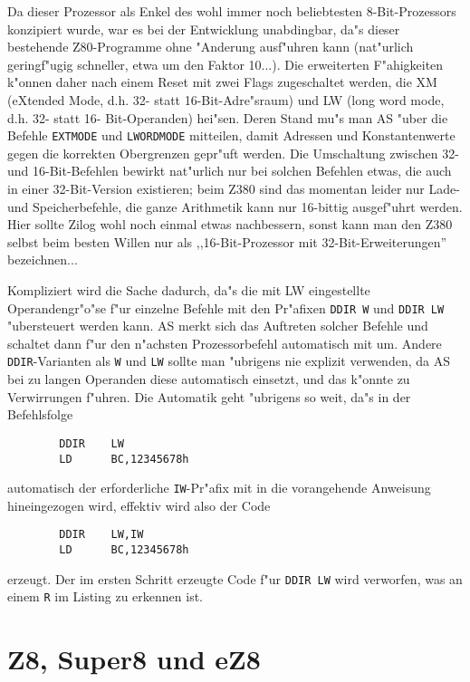 \documentclass[12pt,a4paper,twoside]{report}
\newcommand{\tty}[1]{{\tt #1}}
\begin{document}
Da dieser Prozessor als Enkel des wohl immer noch beliebtesten
8-Bit-Prozessors konzipiert wurde, war es bei der Entwicklung
unabdingbar, da"s dieser bestehende Z80-Programme ohne "Anderung
ausf"uhren kann (nat"urlich geringf"ugig schneller, etwa um den
Faktor 10...).  Die erweiterten F"ahigkeiten k"onnen daher nach
einem Reset mit zwei Flags zugeschaltet werden, die XM (eXtended
Mode, d.h. 32- statt 16-Bit-Adre"sraum) und LW (long word mode,
d.h. 32- statt 16- Bit-Operanden) hei"sen.  Deren Stand mu"s man
AS "uber die Befehle \tty{EXTMODE} und \tty{LWORDMODE} mitteilen, damit
Adressen und Konstantenwerte gegen die korrekten Obergrenzen
gepr"uft werden.  Die Umschaltung zwischen 32- und 16-Bit-Befehlen
bewirkt nat"urlich nur bei solchen Befehlen etwas, die auch in
einer 32-Bit-Version existieren; beim Z380 sind das momentan
leider nur Lade- und Speicherbefehle, die ganze Arithmetik kann
nur 16-bittig ausgef"uhrt werden.  Hier sollte Zilog wohl noch
einmal etwas nachbessern, sonst kann man den Z380 selbst beim
besten Willen nur als ,,16-Bit-Prozessor mit 32-Bit-Erweiterungen''
bezeichnen...

Kompliziert wird die Sache dadurch, da"s die mit LW eingestellte
Operandengr"o"se f"ur einzelne Befehle mit den Pr"afixen \tty{DDIR W}
und \tty{DDIR LW} "ubersteuert werden kann.  AS merkt sich das
Auftreten solcher Befehle und schaltet dann f"ur den n"achsten
Prozessorbefehl automatisch mit um.  Andere \tty{DDIR}-Varianten
als \tty{W} und \tty{LW} sollte man "ubrigens nie explizit
verwenden, da AS bei zu langen Operanden diese automatisch
einsetzt, und das k"onnte zu Verwirrungen f"uhren.  Die Automatik
geht "ubrigens so weit, da"s in der Befehlsfolge
\begin{verbatim}
        DDIR    LW
        LD      BC,12345678h
\end{verbatim}
automatisch der erforderliche \tty{IW}-Pr"afix mit in die
vorangehende Anweisung hineingezogen wird, effektiv wird also
der Code
\begin{verbatim}
        DDIR    LW,IW
        LD      BC,12345678h
\end{verbatim}
erzeugt.  Der im ersten Schritt erzeugte Code f"ur \tty{DDIR LW}
wird verworfen, was an einem \tty{R} im Listing zu erkennen
ist.


\section{Z8, Super8 und eZ8}
\label{Z8Spec}
\end{document}

